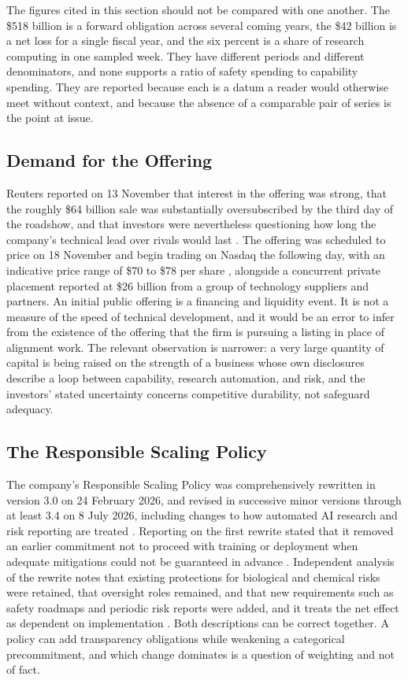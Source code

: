 \documentclass[12pt]{article}
\theoremstyle{definition}
\theoremstyle{remark}
\begin{document}
The figures cited in this section should not be compared with one another. The \$518 billion is a forward obligation across several coming years, the \$42 billion is a net loss for a single fiscal year, and the six percent is a share of research computing in one sampled week. They have different periods and different denominators, and none supports a ratio of safety spending to capability spending. They are reported because each is a datum a reader would otherwise meet without context, and because the absence of a comparable pair of series is the point at issue.

\subsection{Demand for the Offering}

Reuters reported on 13 November that interest in the offering was strong, that the roughly \$64 billion sale was substantially oversubscribed by the third day of the roadshow, and that investors were nevertheless questioning how long the company's technical lead over rivals would last \cite{reuters2026nov}. The offering was scheduled to price on 18 November and begin trading on Nasdaq the following day, with an indicative price range of \$70 to \$78 per share \cite{stockanalysis2026}, alongside a concurrent private placement reported at \$26 billion from a group of technology suppliers and partners. An initial public offering is a financing and liquidity event. It is not a measure of the speed of technical development, and it would be an error to infer from the existence of the offering that the firm is pursuing a listing in place of alignment work. The relevant observation is narrower: a very large quantity of capital is being raised on the strength of a business whose own disclosures describe a loop between capability, research automation, and risk, and the investors' stated uncertainty concerns competitive durability, not safeguard adequacy.

\subsection{The Responsible Scaling Policy}

The company's Responsible Scaling Policy was comprehensively rewritten in version 3.0 on 24 February 2026, and revised in successive minor versions through at least 3.4 on 8 July 2026, including changes to how automated AI research and risk reporting are treated \cite{rsp,governance2026}. Reporting on the first rewrite stated that it removed an earlier commitment not to proceed with training or deployment when adequate mitigations could not be guaranteed in advance \cite{pcworldloophole}. Independent analysis of the rewrite notes that existing protections for biological and chemical risks were retained, that oversight roles remained, and that new requirements such as safety roadmaps and periodic risk reports were added, and it treats the net effect as dependent on implementation \cite{governance2026}. Both descriptions can be correct together. A policy can add transparency obligations while weakening a categorical precommitment, and which change dominates is a question of weighting and not of fact.
\end{document}
